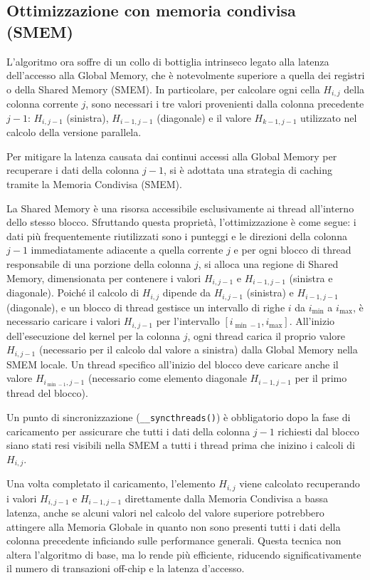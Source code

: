 \documentclass[a4paper,12pt]{article}
\begin{document}
\subsection{Ottimizzazione con memoria condivisa (SMEM)}

L'algoritmo ora soffre di un collo di bottiglia intrinseco legato alla latenza dell'accesso alla Global Memory, che è notevolmente superiore a quella dei registri o della Shared Memory (SMEM). In particolare, per calcolare ogni cella $H_{i,j}$ della colonna corrente $j$, sono necessari i tre valori provenienti dalla colonna precedente $j-1$: $H_{i,j-1}$ (sinistra), $H_{i-1,j-1}$ (diagonale) e il valore $H_{k-1,j-1}$ utilizzato nel calcolo della versione parallela.

Per mitigare la latenza causata dai continui accessi alla Global Memory per recuperare i dati della colonna $j-1$, si è adottata una strategia di caching tramite la Memoria Condivisa (SMEM).

La Shared Memory è una risorsa accessibile esclusivamente ai thread all'interno dello stesso blocco. Sfruttando questa proprietà, l'ottimizzazione è come segue: i dati più frequentemente riutilizzati sono i punteggi e le direzioni della colonna $j-1$ immediatamente adiacente a quella corrente $j$ e per ogni blocco di thread responsabile di una porzione della colonna $j$, si alloca una regione di Shared Memory, dimensionata per contenere i valori $H_{i,j-1}$ e $H_{i-1,j-1}$ (sinistra e diagonale). Poiché il calcolo di $H_{i,j}$ dipende da $H_{i,j-1}$ (sinistra) e $H_{i-1,j-1}$ (diagonale), e un blocco di thread gestisce un intervallo di righe $i$ da $i_{\min}$ a $i_{\max}$, è necessario caricare i valori $H_{i,j-1}$ per l'intervallo $[i_{\min-1},i_{\max}]$.
All'inizio dell'esecuzione del kernel per la colonna $j$, ogni thread carica il proprio valore $H_{i,j-1}$ (necessario per il calcolo dal valore a sinistra) dalla Global Memory nella SMEM locale. Un thread specifico all'inizio del blocco deve caricare anche il valore $H_{i_{\min-1},j-1}$ (necessario come elemento diagonale $H_{i-1,j-1}$ per il primo thread del blocco).

Un punto di sincronizzazione (\texttt{\_\_syncthreads()}) è obbligatorio dopo la fase di caricamento per assicurare che tutti i dati della colonna $j-1$ richiesti dal blocco siano stati resi visibili nella SMEM a tutti i thread prima che inizino i calcoli di $H_{i,j}$.

Una volta completato il caricamento, l'elemento $H_{i,j}$ viene calcolato recuperando i valori $H_{i,j-1}$ e $H_{i-1,j-1}$ direttamente dalla Memoria Condivisa a bassa latenza, anche se alcuni valori nel calcolo del valore superiore potrebbero attingere alla Memoria Globale in quanto non sono presenti tutti i dati della colonna precedente inficiando sulle performance generali.
Questa tecnica non altera l'algoritmo di base, ma lo rende più efficiente, riducendo significativamente il numero di transazioni off-chip e la latenza d'accesso.
\end{document}
